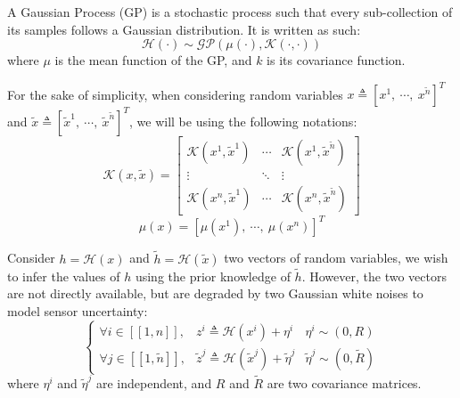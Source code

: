 \documentclass[conference]{IEEEtran}
\begin{document}
A Gaussian Process (GP) is a stochastic process such that every sub-collection of its samples follows a Gaussian distribution. It is written as such:
\begin{equation}
\mathcal{H}(\cdot) \sim \mathcal{GP}( \mu(\cdot), \mathcal{K}(\cdot, \cdot))
\end{equation} \label{eq:GP}
where $\mu$ is the mean function of the GP, and $k$ is its covariance function.

For the sake of simplicity, when considering random variables $x \triangleq [x^1, \: \cdots, \: x^{\tilde n}]^T$ and $\tilde{x} \triangleq [\tilde x^1, \: \cdots, \: \tilde x^{\tilde n}]^T$, we will be using the following notations:
\begin{equation}
\mathcal{K}(x, \tilde{x}) = \begin{bmatrix}
\mathcal{K}(x^1, \tilde x^1) & \cdots & \mathcal{K}(x^1, \tilde x^{\tilde n}) \\
\vdots & \ddots & \vdots \\
\mathcal{K}(x^n, \tilde x^1) & \cdots & \mathcal{K}(x^n, \tilde x^{\tilde n})
\end{bmatrix}
\end{equation}
\begin{equation}
\mu(x) = [\mu(x^1), \: \cdots, \: \mu(x^n)]^T
\end{equation}

Consider $h = \mathcal{H}(x)$ and $\tilde{h} = \mathcal{H}(\tilde{x})$ two vectors of random variables, we wish to infer the values of $h$ using the prior knowledge of $\tilde{h}$. However, the two vectors are not directly available, but are degraded by two Gaussian white noises to model sensor uncertainty:
\begin{equation}
\left\{
\begin{matrix}
\forall i \in [\![1, n]\!], & z^i \triangleq \mathcal{H}(x^i) + \eta^i & \eta^i \sim(0, R) \\
\forall j \in [\![1, \tilde n]\!], & \tilde z^j \triangleq \mathcal{H}(\tilde x^j) + \tilde\eta^j & \tilde\eta^j \sim(0, \tilde R)
\end{matrix}
\right. \label{eq:noisy H}
\end{equation}
where $\eta^i$ and $\tilde\eta^j$ are independent, and $R$ and $\tilde R$ are two covariance matrices.
\end{document}
